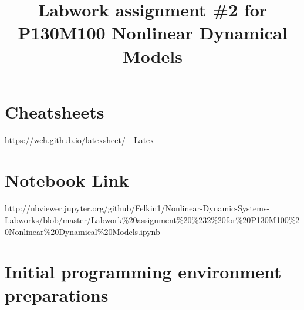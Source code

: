 \documentclass[11pt]{article}
\title{Labwork assignment \#2 for P130M100 Nonlinear Dynamical Models}
\begin{document}
    
    
    \maketitle
    
    

    
    \hypertarget{cheatsheets}{%
\section{Cheatsheets}\label{cheatsheets}}

https://wch.github.io/latexsheet/ - Latex

    \hypertarget{notebook-link}{%
\section{Notebook Link}\label{notebook-link}}

http://nbviewer.jupyter.org/github/Felkin1/Nonlinear-Dynamic-Systems-Labworks/blob/master/Labwork\%20assignment\%20\%232\%20for\%20P130M100\%20Nonlinear\%20Dynamical\%20Models.ipynb

    \hypertarget{initial-programming-environment-preparations}{%
\section{Initial programming environment
preparations}\label{initial-programming-environment-preparations}}
\end{document}
